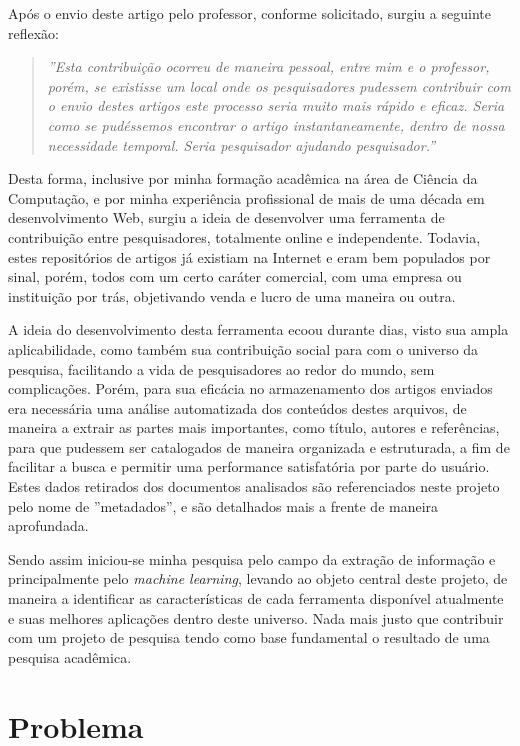 Após o envio deste artigo pelo professor, conforme solicitado, surgiu a seguinte reflexão:

\begin{quote}
	\textit{''Esta contribuição ocorreu de maneira pessoal, entre mim e o professor, porém, se existisse um local onde os pesquisadores pudessem contribuir com o envio destes artigos este processo seria muito mais rápido e eficaz. Seria como se pudéssemos encontrar o artigo instantaneamente, dentro de nossa necessidade temporal. Seria pesquisador ajudando pesquisador.''}
\end{quote}

Desta forma, inclusive por minha formação acadêmica na área de Ciência da Computação, e por minha experiência profissional de mais de uma década em desenvolvimento Web, surgiu a ideia de desenvolver uma ferramenta de contribuição entre pesquisadores, totalmente online e independente. Todavia, estes repositórios de artigos já existiam na Internet e eram bem populados por sinal, porém, todos com um certo caráter comercial, com uma empresa ou instituição por trás, objetivando venda e lucro de uma maneira ou outra.

A ideia do desenvolvimento desta ferramenta ecoou durante dias, visto sua ampla aplicabilidade, como também sua contribuição social para com o universo da pesquisa, facilitando a vida de pesquisadores ao redor do mundo, sem complicações. Porém, para sua eficácia no armazenamento dos artigos enviados era necessária uma análise automatizada dos conteúdos destes arquivos, de maneira a extrair as partes mais importantes, como título, autores e referências, para que pudessem ser catalogados de maneira organizada e estruturada, a fim de facilitar a busca e permitir uma performance satisfatória por parte do usuário. Estes dados retirados dos documentos analisados são referenciados neste projeto pelo nome de ''metadados'', e são detalhados mais a frente de maneira aprofundada.

Sendo assim iniciou-se minha pesquisa pelo campo da extração de informação e principalmente pelo \textit{machine learning}, levando ao objeto central deste projeto, de maneira a identificar as características de cada ferramenta disponível atualmente e suas melhores aplicações dentro deste universo. Nada mais justo que contribuir com um projeto de pesquisa tendo como base fundamental o resultado de uma pesquisa acadêmica.

\section{Problema}
\label{sec:problem}

